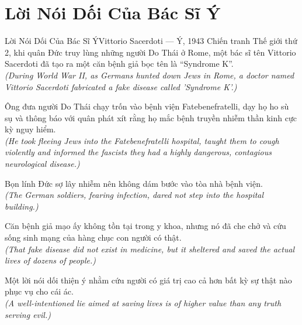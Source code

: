 \section{Lời Nói Dối Của Bác Sĩ Ý}
\begin{truyen}{Lời Nói Dối Của Bác Sĩ Ý}{Vittorio Sacerdoti --- Ý, 1943}
 Chiến tranh Thế giới thứ 2, khi quân Đức truy lùng những người Do Thái ở Rome, một bác sĩ tên Vittorio Sacerdoti đã tạo ra một căn bệnh giả bọc tên là ``Syndrome K''.\\[4pt]
\textit{(During World War II, as Germans hunted down Jews in Rome, a doctor named Vittorio Sacerdoti fabricated a fake disease called 'Syndrome K'.)}

Ông đưa người Do Thái chạy trốn vào bệnh viện Fatebenefratelli, dạy họ ho sù sụ và thông báo với quân phát xít rằng họ mắc bệnh truyền nhiễm thần kinh cực kỳ nguy hiểm.\\[4pt]
\textit{(He took fleeing Jews into the Fatebenefratelli hospital, taught them to cough violently and informed the fascists they had a highly dangerous, contagious neurological disease.)}

Bọn lính Đức sợ lây nhiễm nên không dám bước vào tòa nhà bệnh viện.\\[4pt]
\textit{(The German soldiers, fearing infection, dared not step into the hospital building.)}

Căn bệnh giả mạo ấy không tồn tại trong y khoa, nhưng nó đã che chở và cứu sống sinh mạng của hàng chục con người có thật.\\[4pt]
\textit{(That fake disease did not exist in medicine, but it sheltered and saved the actual lives of dozens of people.)}

\end{truyen}
\begin{baihoc}
  Một lời nói dối thiện ý nhằm cứu người có giá trị cao cả hơn bất kỳ sự thật nào phục vụ cho cái ác.\\[4pt]
  \textit{(A well-intentioned lie aimed at saving lives is of higher value than any truth serving evil.)}
\end{baihoc}

